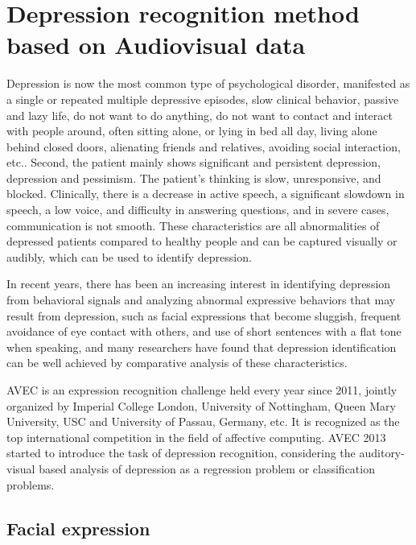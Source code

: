 
\ifx\allfiles\undefined
    
\fi

\section{Depression recognition method based on Audiovisual data}
\label{sec_approach}

Depression is now the most common type of psychological disorder, manifested as a single or repeated multiple depressive episodes, slow clinical behavior, passive and lazy life, do not want to do anything, do not want to contact and interact with people around, often sitting alone, or lying in bed all day, living alone behind closed doors, alienating friends and relatives, avoiding social interaction, etc.. Second, the patient mainly shows significant and persistent depression, depression and pessimism. The patient's thinking is slow, unresponsive, and blocked. Clinically, there is a decrease in active speech, a significant slowdown in speech, a low voice, and difficulty in answering questions, and in severe cases, communication is not smooth. These characteristics are all abnormalities of depressed patients compared to healthy people and can be captured visually or audibly, which can be used to identify depression.

In recent years, there has been an increasing interest in identifying depression from behavioral signals and analyzing abnormal expressive behaviors that may result from depression, such as facial expressions that become sluggish, frequent avoidance of eye contact with others, and use of short sentences with a flat tone when speaking, and many researchers have found that depression identification can be well achieved by comparative analysis of these characteristics.

AVEC is an expression recognition challenge held every year since 2011, jointly organized by Imperial College London, University of Nottingham, Queen Mary University, USC and University of Passau, Germany, etc. It is recognized as the top international competition in the field of affective computing. AVEC 2013 started to introduce the task of depression recognition, considering the auditory-visual based analysis of depression as a regression problem or classification problems.

\subsection{Facial expression}
\label{sec_fquality}

